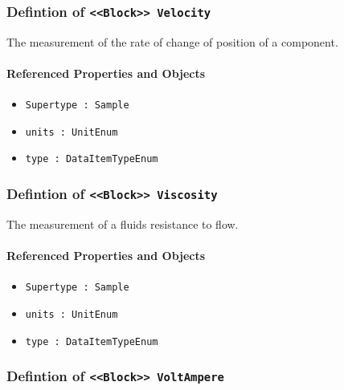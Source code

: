 \subsubsection{Defintion of \texttt{<<Block>> Velocity}}
  \label{type:Velocity}

\FloatBarrier

The measurement of the rate of change of position of a component.

\FloatBarrier
\paragraph{Referenced Properties and Objects}

\begin{itemize}
\item \texttt{Supertype : Sample}

\item \texttt{units : UnitEnum}

\item \texttt{type : DataItemTypeEnum}

\end{itemize}
\FloatBarrier
\subsubsection{Defintion of \texttt{<<Block>> Viscosity}}
  \label{type:Viscosity}

\FloatBarrier

The measurement of a fluids resistance to flow.

\FloatBarrier
\paragraph{Referenced Properties and Objects}

\begin{itemize}
\item \texttt{Supertype : Sample}

\item \texttt{units : UnitEnum}

\item \texttt{type : DataItemTypeEnum}

\end{itemize}
\FloatBarrier
\subsubsection{Defintion of \texttt{<<Block>> VoltAmpere}}
  \label{type:VoltAmpere}

